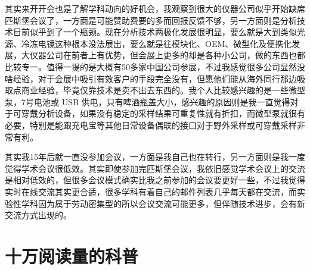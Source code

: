 \documentclass[]{book}
\begin{document}
其实来开开会也是了解学科动向的好机会，我观察到很大的仪器公司似乎开始缺席匹斯堡会议了，一方面是可能赞助费要的多而回报反馈不够，另一方面则是分析技术目前似乎到了一个瓶颈。现在分析技术两极化发展很明显，要么就是大到类似光源、冷冻电镜这种根本没法展出，要么就是往模块化、OEM、微型化及便携化发展，大仪器公司在前者上有优势，但会展上更多的却是各种小公司，做的东西也都比较专一。值得一提的是大概有50多家中国公司参展，不过我感觉很多公司显然没啥经验，对于会展中吸引有效客户的手段完全没有，但愿他们能从海外同行那边吸取点商业经验，毕竟仅靠技术是卖不出去东西的。我个人比较感兴趣的是一些微型泵，7号电池或 USB 供电，只有啤酒瓶盖大小，感兴趣的原因则是我一直觉得对于可穿戴分析设备，如果没有稳定的采样结果可重复性就有折扣，而微型泵就很有必要，特别是能跟充电宝等其他日常设备偶联的接口对于野外采样或可穿戴采样非常有利。

其实我15年后就一直没参加会议，一方面是我自己也在转行，另一方面则是我一度觉得学术会议很低效。其实即使参加完匹斯堡会议，我依旧感觉学术会议上的交流是相对低效的，但很多会议模式确实比我之前参加的会议要更好一些，不过我觉得实时在线交流其实更合适，很多学科有着自己的邮件列表几乎每天都在交流，而实验性学科因为属于劳动密集型的所以会议交流可能更多，但伴随技术进步，会有新交流方式出现的。

\hypertarget{ux5341ux4e07ux9605ux8bfbux91cfux7684ux79d1ux666e}{%
\section{十万阅读量的科普}\label{ux5341ux4e07ux9605ux8bfbux91cfux7684ux79d1ux666e}}
\end{document}
